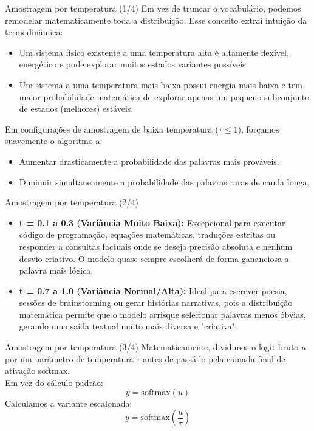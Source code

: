 \documentclass[aspectratio=169]{beamer}
\begin{document}
\begin{frame}{Amostragem por temperatura (1/4)}\justifying
    Em vez de truncar o vocabulário, podemos remodelar matematicamente toda a distribuição. Esse conceito extrai intuição da termodinâmica:
    \begin{itemize}
        \item Um sistema físico existente a uma temperatura alta é altamente flexível, energético e pode explorar muitos estados variantes possíveis.
        \item Um sistema a uma temperatura mais baixa possui energia mais baixa e tem maior probabilidade matemática de explorar apenas um pequeno subconjunto de estados (melhores) estáveis.
    \end{itemize}
    Em configurações de amostragem de baixa temperatura ($\tau \le 1$), forçamos suavemente o algoritmo a:
    \begin{itemize}
        \item Aumentar drasticamente a probabilidade das palavras mais prováveis.
        \item Diminuir simultaneamente a probabilidade das palavras raras de cauda longa.
    \end{itemize}
\end{frame}

\begin{frame}{Amostragem por temperatura (2/4)}\justifying
    \begin{itemize}
        \item \textbf{t = 0.1 a 0.3 (Variância Muito Baixa):} Excepcional para executar código de programação, equações matemáticas, traduções estritas ou responder a consultas factuais onde se deseja precisão absoluta e nenhum desvio criativo. O modelo quase sempre escolherá de forma gananciosa a palavra mais lógica.
        \item \textbf{t = 0.7 a 1.0 (Variância Normal/Alta):} Ideal para escrever poesia, sessões de brainstorming ou gerar histórias narrativas, pois a distribuição matemática permite que o modelo arrisque selecionar palavras menos óbvias, gerando uma saída textual muito mais diversa e "criativa".
    \end{itemize}
\end{frame}

\begin{frame}{Amostragem por temperatura (3/4)}\justifying
    Matematicamente, dividimos o logit bruto $u$ por um parâmetro de temperatura $\tau$ antes de passá-lo pela camada final de ativação softmax. \\
    \vspace{0.5cm}
    Em vez do cálculo padrão:
    \[ y = \text{softmax}(u) \]
    Calculamos a variante escalonada:
    \[ y = \text{softmax}\left(\frac{u}{\tau}\right) \]
\end{frame}
\end{document}
